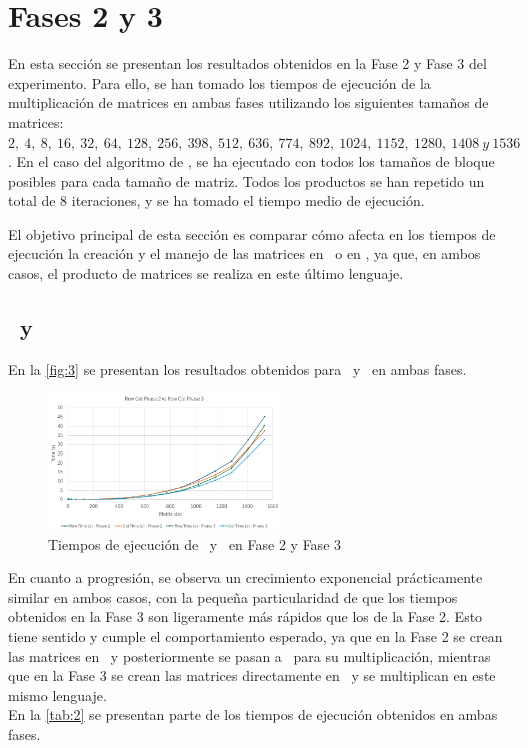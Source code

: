 \pagestyle{fancy}
\fancyhead[l]{\autorUO}
\fancyfoot[l]{\asignaturaAbbr}
\fancyfoot[r]{\fecha}

\section{Fases 2 y 3} \label{sec:4}
En esta sección se presentan los resultados obtenidos en la Fase 2 y Fase 3 del experimento. Para ello, se han tomado los tiempos de 
ejecución de la multiplicación de matrices en ambas fases utilizando los siguientes tamaños de 
matrices: $2,\ 4,\ 8,\ 16,\ 32,\ 64,\ 128,\ 256,\ 398,\ 512,\ 636,\ 774,\ 892,\ 1024,\ 1152,\ 1280,\ 1408 \ y \ 1536$. 
En el caso del algoritmo de \zorder, se ha ejecutado con todos los tamaños de bloque posibles para cada tamaño de matriz.
Todos los productos se han repetido un total de $8$ iteraciones, y se ha tomado el tiempo medio de ejecución.

El objetivo principal de esta sección es comparar cómo afecta en los tiempos de ejecución la creación y el manejo de las matrices 
en \python\ o en \C, ya que, en ambos casos, el producto de matrices se realiza en este último lenguaje.

\subsection{\rowmajor\ y \colmajor} \label{sec:4.1}
En la \autoref{fig:3} se presentan los resultados obtenidos para \rowmajor\ y \colmajor\ en ambas fases.

\begin{figure}[h]
    \centering
    \includegraphics[width=0.55\textwidth]{img/3.png}
    \caption{Tiempos de ejecución de \rowmajor\ y \colmajor\ en Fase 2 y Fase 3}
    \label{fig:3}
\end{figure}

En cuanto a progresión, se observa un crecimiento exponencial prácticamente similar en ambos casos, con la pequeña particularidad 
de que los tiempos obtenidos en la Fase 3 son ligeramente más rápidos que los de la Fase 2. Esto tiene sentido y cumple el 
comportamiento esperado, ya que en la Fase 2 se crean las matrices en \python\ y posteriormente se pasan a \C\ para su
multiplicación, mientras que en la Fase 3 se crean las matrices directamente en \C\ y se multiplican en este mismo lenguaje. \\
En la \autoref{tab:2} se presentan parte de los tiempos de ejecución obtenidos en ambas fases.

